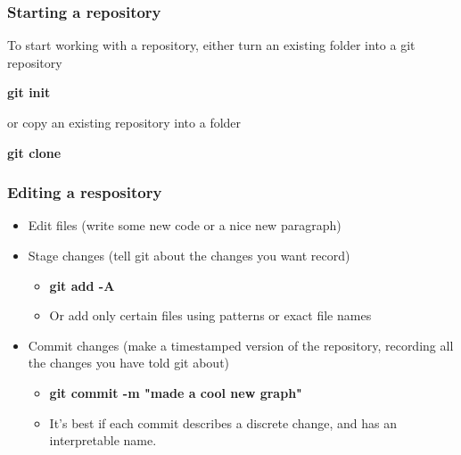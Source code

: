 \documentclass{beamer}
\newcommand{\code}[1]{{\fontfamily{pcr}\selectfont \textbf{#1}}}
\begin{document}


\begin{frame}
\frametitle{Starting a repository}

To start working with a repository, either turn an existing folder into a git repository

\medskip

\code{git init}

\medskip

or copy an existing repository into a folder

\medskip

\code{git clone}

\end{frame}

\begin{frame}
	\frametitle{Editing a respository}
	
	\begin{itemize}
		\item<1-> Edit files (write some new code or a nice new paragraph)
		
\par\noindent\hrulefill\par
		
		\item<2-> Stage changes (tell git about the changes you want record)
		
		\begin{itemize}
			\item \code{git add -A}
			\item Or add only certain files using patterns or exact file names
		\end{itemize}
		
		\par\noindent\hrulefill\par
		
		\item<3-> Commit changes (make a timestamped version of the repository, recording all the changes you have told git about)
		\begin{itemize}
			\item \code{git commit -m "made a cool new graph"}
			\item It's best if each commit describes a discrete change, and has an interpretable name.
		\end{itemize}
		
		\par\noindent\hrulefill\par
	\end{itemize}
	
	
\end{frame}
\end{document}
